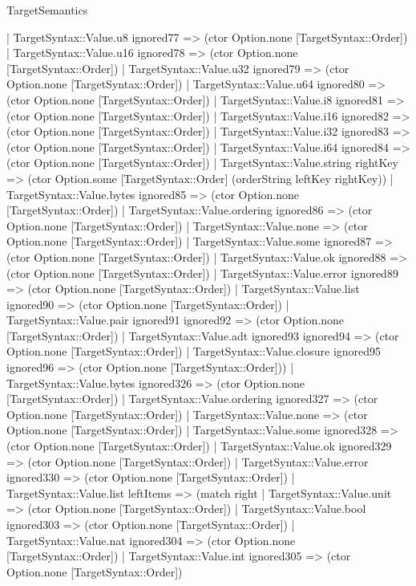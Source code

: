 \begin{lexlean}{TargetSemantics}
\begin{semanticmodule}
{      | TargetSyntax::Value.u8 ignored77 => (ctor Option.none [TargetSyntax::Order])
      | TargetSyntax::Value.u16 ignored78 => (ctor Option.none [TargetSyntax::Order])
      | TargetSyntax::Value.u32 ignored79 => (ctor Option.none [TargetSyntax::Order])
      | TargetSyntax::Value.u64 ignored80 => (ctor Option.none [TargetSyntax::Order])
      | TargetSyntax::Value.i8 ignored81 => (ctor Option.none [TargetSyntax::Order])
      | TargetSyntax::Value.i16 ignored82 => (ctor Option.none [TargetSyntax::Order])
      | TargetSyntax::Value.i32 ignored83 => (ctor Option.none [TargetSyntax::Order])
      | TargetSyntax::Value.i64 ignored84 => (ctor Option.none [TargetSyntax::Order])
      | TargetSyntax::Value.string rightKey => (ctor Option.some [TargetSyntax::Order] (orderString leftKey rightKey))
      | TargetSyntax::Value.bytes ignored85 => (ctor Option.none [TargetSyntax::Order])
      | TargetSyntax::Value.ordering ignored86 => (ctor Option.none [TargetSyntax::Order])
      | TargetSyntax::Value.none => (ctor Option.none [TargetSyntax::Order])
      | TargetSyntax::Value.some ignored87 => (ctor Option.none [TargetSyntax::Order])
      | TargetSyntax::Value.ok ignored88 => (ctor Option.none [TargetSyntax::Order])
      | TargetSyntax::Value.error ignored89 => (ctor Option.none [TargetSyntax::Order])
      | TargetSyntax::Value.list ignored90 => (ctor Option.none [TargetSyntax::Order])
      | TargetSyntax::Value.pair ignored91 ignored92 => (ctor Option.none [TargetSyntax::Order])
      | TargetSyntax::Value.adt ignored93 ignored94 => (ctor Option.none [TargetSyntax::Order])
      | TargetSyntax::Value.closure ignored95 ignored96 => (ctor Option.none [TargetSyntax::Order]))
    | TargetSyntax::Value.bytes ignored326 => (ctor Option.none [TargetSyntax::Order])
    | TargetSyntax::Value.ordering ignored327 => (ctor Option.none [TargetSyntax::Order])
    | TargetSyntax::Value.none => (ctor Option.none [TargetSyntax::Order])
    | TargetSyntax::Value.some ignored328 => (ctor Option.none [TargetSyntax::Order])
    | TargetSyntax::Value.ok ignored329 => (ctor Option.none [TargetSyntax::Order])
    | TargetSyntax::Value.error ignored330 => (ctor Option.none [TargetSyntax::Order])
    | TargetSyntax::Value.list leftItems => (match right
      | TargetSyntax::Value.unit => (ctor Option.none [TargetSyntax::Order])
      | TargetSyntax::Value.bool ignored303 => (ctor Option.none [TargetSyntax::Order])
      | TargetSyntax::Value.nat ignored304 => (ctor Option.none [TargetSyntax::Order])
      | TargetSyntax::Value.int ignored305 => (ctor Option.none [TargetSyntax::Order])
}
\end{semanticmodule}
\end{lexlean}

